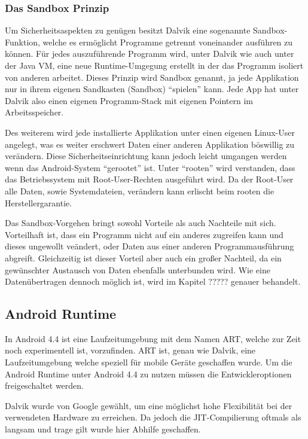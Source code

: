 \subsubsection{Das Sandbox Prinzip} \label{Das Sandbox Prinzip}
Um Sicherheitsaspekten zu gen\"ugen besitzt Dalvik eine sogenannte Sandbox-Funktion, welche es erm\"oglicht Programme getrennt voneinander ausf\"uhren zu k\"onnen. F\"ur jedes auszuf\"uhrende Programm wird, unter Dalvik wie auch unter der Java VM, eine neue Runtime-Umgegung erstellt in der das Programm isoliert von anderen arbeitet. 
Dieses Prinzip wird Sandbox genannt, ja jede Applikation nur in ihrem eigenen Sandkasten (Sandbox) "`spielen"' kann. Jede App hat unter Dalvik also einen eigenen Programm-Stack mit eigenen Pointern im Arbeitsspeicher.

Des weiterem wird jede installierte Applikation unter einen eigenen Linux-User angelegt, was es weiter erschwert Daten einer anderen Applikation b\"oswillig zu ver\"andern. Diese Sicherheitseinrichtung kann jedoch leicht umgangen werden wenn das Android-System "`gerootet"' ist. Unter "`rooten"' wird verstanden, dass das Betriebssystem mit Root-User-Rechten ausgef\"uhrt wird. Da der Root-User alle Daten, sowie Systemdateien, ver\"andern kann erlischt beim rooten die Herstellergarantie. \cite{Android44}

Das Sandbox-Vorgehen bringt sowohl Vorteile als auch Nachteile mit sich. Vorteilhaft ist, dass ein Programm nicht auf ein anderes zugreifen kann und dieses ungewollt ve\"andert, oder Daten aus einer anderen Programmausf\"uhrung abgreift. Gleichzeitig ist dieser Vorteil aber auch ein gro\ss{}er Nachteil, da ein gew\"unschter Austausch von Daten ebenfalls unterbunden wird.
Wie eine Daten\"ubertragen dennoch m\"oglich ist, wird im Kapitel ????? genauer behandelt.

\subsection{Android Runtime}
In Android 4.4 ist eine Laufzeitumgebung mit dem Namen \ac{ART}, welche zur Zeit noch experimentell ist, vorzufinden. \ac{ART} ist, genau wie Dalvik, eine Laufzeitumgebung welche speziell f\"ur mobile Ger\"ate geschaffen wurde. Um die Android Runtime unter Android 4.4 zu nutzen m\"ussen die Entwickleroptionen freigeschaltet werden.

Dalvik wurde von Google gew\"ahlt, um eine m\"oglichst hohe Flexibilit\"at bei der verwendeten Hardware zu erreichen. Da jedoch die \ac{JIT}-Compilierung oftmals als langsam und trage gilt wurde hier Abhilfe geschaffen.

